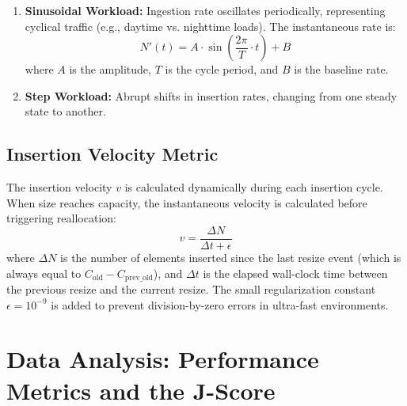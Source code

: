 \begin{enumerate}
\begin{equation}
    \end{equation}
    where $N_{\max}$ is the asymptotic upper limit of the array size.
    \item \textbf{Sinusoidal Workload:} Ingestion rate oscillates periodically, 
    representing cyclical traffic (e.g., daytime vs. nighttime loads). The instantaneous 
    rate is:
    \begin{equation}
        N'(t) = A \cdot \sin\left(\frac{2\pi}{T} \cdot t\right) + B
    \end{equation}
    where $A$ is the amplitude, $T$ is the cycle period, and $B$ is the baseline rate.
    \item \textbf{Step Workload:} Abrupt shifts in insertion rates, changing 
    from one steady state to another.
\end{enumerate}

\subsection{Insertion Velocity Metric}
The insertion velocity $v$ is calculated dynamically during each insertion 
cycle. When size reaches capacity, the instantaneous velocity is calculated 
before triggering reallocation:
\begin{equation}
    v = \frac{\Delta N}{\Delta t + \epsilon}
\end{equation}
where $\Delta N$ is the number of elements inserted since the last resize event 
(which is always equal to $C_{\text{old}} - C_{\text{prev\_old}}$), and $\Delta t$ 
is the elapsed wall-clock time between the previous resize and the current 
resize. The small regularization constant $\epsilon = 10^{-9}$ is added to 
prevent division-by-zero errors in ultra-fast environments.

\section{Data Analysis: Performance Metrics and the J-Score}

